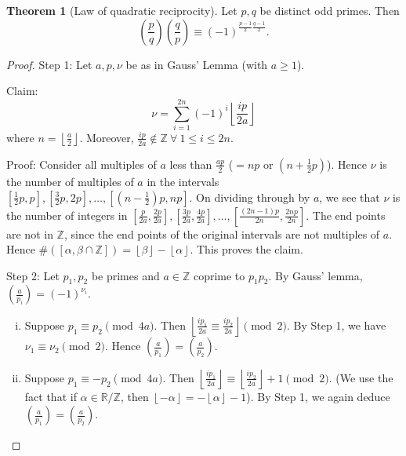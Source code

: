 \documentclass{article}
\theoremstyle{definition}
\newtheorem{theorem}{Theorem}[section]
\begin{document}
\begin{theorem}[Law of quadratic reciprocity]
    Let $p,q$ be distinct odd primes. Then \[
    \left(\frac{p}{q}\right)\left(\frac{q}{p}\right) \equiv (-1)^{\frac{p-1}{2}\frac{q-1}{2}}.
    \]
\end{theorem} 
\begin{proof}
    Step 1: Let $a,p,\nu$ be as in Gauss' Lemma (with $a\ge 1$).
    \vspace{1mm}
    
    Claim: $$\nu = \sum_{i=1}^{2n} (-1)^{i} \left\lfloor \frac{ip}{2a} \right\rfloor$$ where $n = \left\lfloor \frac{a}{2} \right\rfloor$. Moreover, $\frac{ip}{2a} \not\in \mathbb{Z} ~\forall~1\le i\le 2n$.
    \vspace{1mm}
    
    Proof: Consider all multiples of $a$ less than $\frac{ap}{2}$ ($=np$ or $(n+\frac{1}{2}p)$). Hence $\nu$ is the number of multiples of $a$ in the intervals $[\frac{1}{2}p,p], [\frac{3}{2}p, 2p],\ldots, [(n-\frac{1}{2})p,np]$. On dividing through by $a$, we see that $\nu$ is the number of integers in $[\frac{p}{2a},\frac{2p}{2a}],[\frac{3p}{2a},\frac{4p}{2a}],\ldots,[\frac{(2n-1)p}{2n},\frac{2np}{2n}]$. The end points are not in $\mathbb{Z}$, since the end points of the original intervals are not multiples of $a$. Hence $\# ([\alpha,\beta \cap \mathbb{Z}]) = \left\lfloor \beta \right\rfloor - \left\lfloor \alpha \right\rfloor$. This proves the claim.
    \vspace{1mm}
    
    Step 2: Let $p_1,p_2$ be primes and $a \in \mathbb{Z}$ coprime to $p_1p_2$. By Gauss' lemma, $\left(\frac{a}{p_i}\right) = (-1)^{\nu_i}$.
    \begin{enumerate}[(i)]
        \item Suppose $p_1 \equiv p_2 \pmod{4a}$. Then $\left\lfloor \frac{ip_1}{2a} \equiv \frac{ip_2}{2a} \right\rfloor \pmod{2}$. By Step 1, we have $\nu_1 \equiv \nu_2 \pmod{2}$. Hence $\left(\frac{a}{p_1}\right) = \left(\frac{a}{p_2}\right)$.
        \item Suppose $p_1 \equiv -p_2 \pmod{4a}$. Then $\left\lfloor \frac{ip_1}{2a} \right\rfloor \equiv \left\lfloor \frac{ip_2}{2a} \right\rfloor +1 \pmod{2}$. (We use the fact that if $\alpha \in \mathbb{R}/\mathbb{Z}$, then $\left\lfloor -\alpha \right\rfloor = -\left\lfloor \alpha \right\rfloor-1$). By Step 1, we again deduce $\left(\frac{a}{p_1}\right) = \left(\frac{a}{p_2}\right)$.
    \end{enumerate}
    \vspace{1mm}
    

\end{proof}
\end{document}
